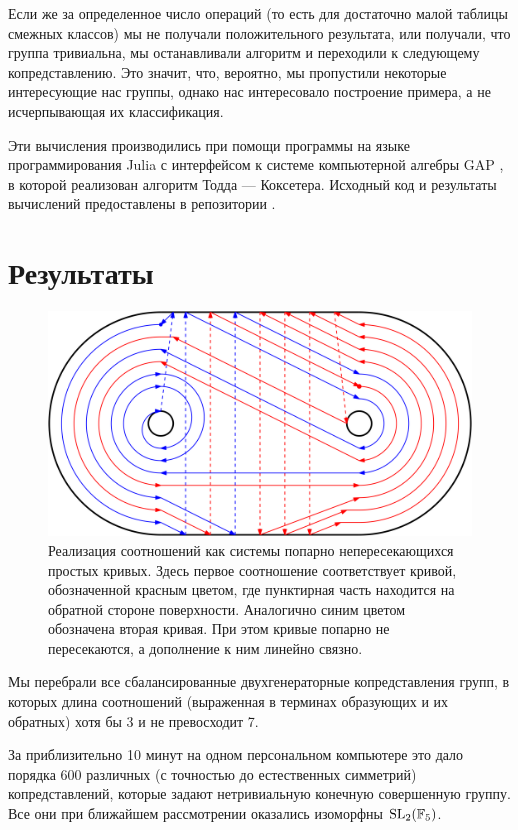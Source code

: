 \documentclass[a4paper, 12pt]{article}
\theoremstyle{definition}
\begin{document}
    Если же за определенное число операций (то есть для достаточно малой таблицы смежных классов) мы не получали положительного результата, или получали, что группа тривиальна, мы останавливали алгоритм и переходили к следующему копредставлению. Это значит, что, вероятно, мы пропустили некоторые интересующие нас группы, однако нас интересовало построение примера, а не исчерпывающая их классификация.

    Эти вычисления производились при помощи программы на языке программирования Julia \cite{Julia-2017} с интерфейсом к системе компьютерной алгебры GAP \cite{GAP4}, в которой реализован алгоритм Тодда — Коксетера. Исходный код и результаты вычислений предоставлены в репозитории \cite{Dyakonov2023}.
    

\section{Результаты}

    \begin{figure}[h] 
        \includegraphics[width=\textwidth]{diagram} 
        \caption{Реализация соотношений как системы попарно непересекающихся простых кривых. Здесь первое соотношение соответствует кривой, обозначенной красным цветом, где пунктирная часть находится на обратной стороне поверхности. Аналогично синим цветом обозначена вторая кривая. При этом кривые попарно не пересекаются, а дополнение к ним линейно связно.}
        \label{fig_1}
    \end{figure}

    Мы перебрали все сбалансированные двухгенераторные копредставления групп, в которых длина соотношений (выраженная в терминах образующих и их обратных) хотя бы 3 и не превосходит 7.

    За приблизительно 10 минут на одном персональном компьютере это дало порядка 600 различных (с точностью до естественных симметрий) копредставлений, которые задают нетривиальную конечную совершенную группу. Все они при ближайшем рассмотрении оказались изоморфны $\textnormal{SL}_2(\mathbb{F}_5)$.
\end{document}
